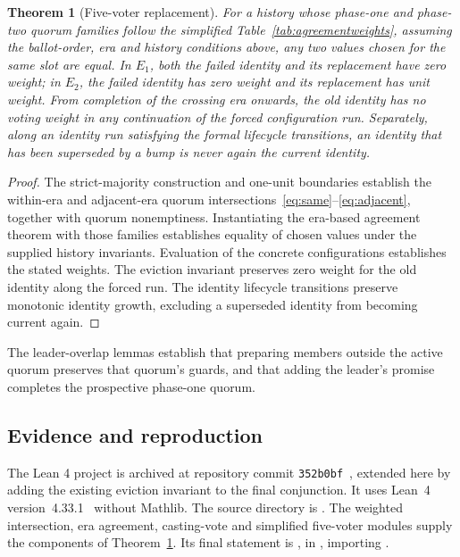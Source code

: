 \documentclass[10pt,journal,letterpaper]{IEEEtran}
\newtheorem{theorem}{Theorem}
\newcommand{\code}[1]{\texttt{#1}}
\begin{document}
\begin{theorem}[Five-voter replacement]\label{thm:replacement}
For a history whose phase-one and phase-two quorum families follow the simplified Table~\ref{tab:agreementweights}, assuming the ballot-order, era and history conditions above, any two values chosen for the same slot are equal. In $E_1$, both the failed identity and its replacement have zero weight; in $E_2$, the failed identity has zero weight and its replacement has unit weight. From completion of the crossing era onwards, the old identity has no voting weight in any continuation of the forced configuration run. Separately, along an identity run satisfying the formal lifecycle transitions, an identity that has been superseded by a bump is never again the current identity.
\end{theorem}

\begin{proof}
The strict-majority construction and one-unit boundaries establish the within-era and adjacent-era quorum intersections~\eqref{eq:same}--\eqref{eq:adjacent}, together with quorum nonemptiness. Instantiating the era-based agreement theorem with those families establishes equality of chosen values under the supplied history invariants. Evaluation of the concrete configurations establishes the stated weights. The eviction invariant preserves zero weight for the old identity along the forced run. The identity lifecycle transitions preserve monotonic identity growth, excluding a superseded identity from becoming current again.
\end{proof}

The leader-overlap lemmas establish that preparing members outside the active quorum preserves that quorum's guards, and that adding the leader's promise completes the prospective phase-one quorum.

\subsection{Evidence and reproduction}
The Lean 4 project is archived at repository commit \code{352b0bf}~\cite{artifact}, extended here by adding the existing eviction invariant to the final conjunction. It uses Lean~4 version~4.33.1~\cite{lean4} without Mathlib. The source directory is . The weighted intersection, era agreement, casting-vote and simplified five-voter modules supply the components of Theorem~\ref{thm:replacement}. Its final statement is , in , importing .
\end{document}
